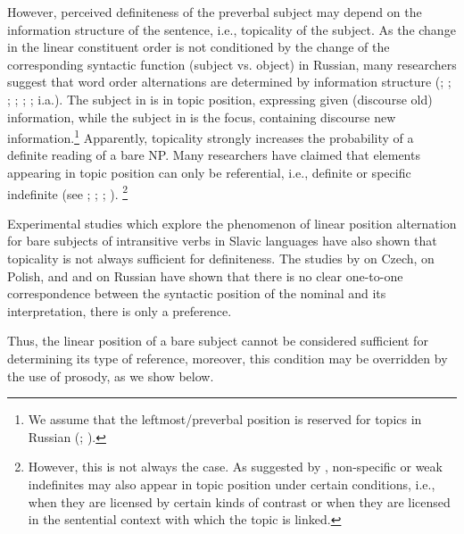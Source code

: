 \documentclass[output=paper,
colorlinks,
citecolor=brown,
newtxmath
]{langscibook}
\begin{document}
    \largerpage[-2] %

However, perceived definiteness of the preverbal subject may depend on the information structure of the sentence, i.e., topicality of the subject. As the change in the linear constituent order is not conditioned by the change of the corresponding syntactic function (subject vs. object) in Russian, many researchers suggest that word order alternations are determined by information structure (\citealt{Mathesius1964}; \citealt{Sgall1972}; \citealt{Hajicova1974}; \citealt{Isacenko1976}; \citealt{Yokoyama1987}; \citealt{Comrie1981}; i.a.). The subject in  is in topic position,  expressing given (discourse old) information, while the subject in  is the focus, containing discourse new information.\footnote{We assume that the leftmost/preverbal position is reserved for topics in Russian (\citealt{Geist2010}; \citealt{Jasinskaja2016}).} Apparently, topicality strongly increases the probability of a definite reading of a bare NP. Many researchers have claimed that elements appearing in topic position can only be referential, i.e., definite or specific indefinite (see \citealt{Reinhart1981}; \citealt{Erteschik-Shir1998}; \citealt{Portner.Yabushita2001}; \citealt{Endriss2009}).%
\footnote{However, this is not always the case. As suggested by \citet{Leonetti2010}, non-specific or weak indefinites may also appear in topic position under certain conditions, i.e., when they are licensed by certain kinds of contrast %
or when they are licensed in the sentential context with which the topic is linked.}

Experimental studies which explore the phenomenon of linear position alternation for bare subjects of intransitive verbs in Slavic languages have also shown that topicality is not always sufficient for definiteness. The studies by \citet{Simik2014} on Czech, \citet{Czardybon.etal2014} on Polish, and \citet{Borik.etal2019} and \citet{Seres.etal2019} on Russian have shown that there is no clear one-to-one correspondence between the syntactic position of the nominal and its interpretation, there is only a preference.

Thus, the linear position of a bare subject %
cannot be considered sufficient for determining its type of reference, moreover, this condition may be overridden by the use of prosody, as we show below.
\end{document}
